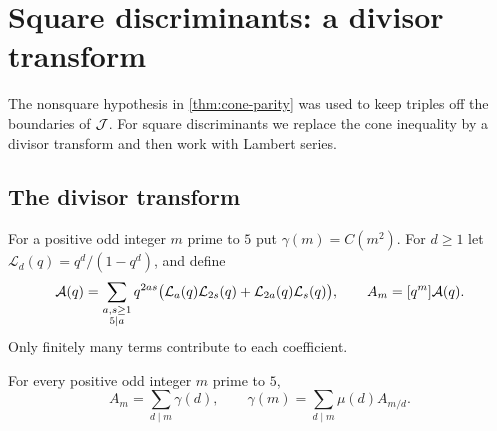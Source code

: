 \section{Square discriminants: a divisor transform}\label{sec:divisor}

The nonsquare hypothesis in \cref{thm:cone-parity} was used to keep triples off
the boundaries of $\mathcal J$. For square discriminants we replace the cone
inequality by a divisor transform and then work with Lambert series.

\subsection{The divisor transform}
For a positive odd integer $m$ prime to $5$ put $\gamma(m)=C(m^2)$. For $d\ge1$ let
$\mathcal L_d(q)=q^d/(1-q^d)$, and define
\[
  \mathcal A(q)=\sum_{\substack{a,s\ge1\\5\mid a}}q^{2as}\bigl(\mathcal L_a(q)\mathcal L_{2s}(q)+\mathcal L_{2a}(q)\mathcal L_s(q)\bigr),
  \qquad A_m=[q^{m}]\mathcal A(q).
\]
Only finitely many terms contribute to each coefficient.

\begin{proposition}\label{prop:divisor-transform}
For every positive odd integer $m$ prime to $5$,
\[
  A_m=\sum_{d\mid m}\gamma(d),\qquad \gamma(m)=\sum_{d\mid m}\mu(d)A_{m/d}.
\]
\end{proposition}


